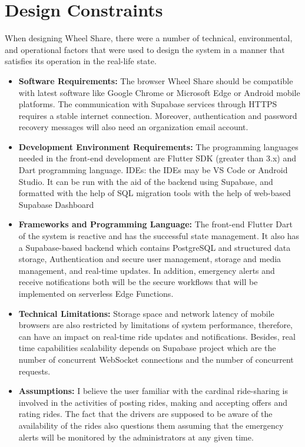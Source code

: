 \section{Design Constraints}
When designing Wheel Share, there were a number of technical, environmental, and operational factors that were used to design the system in a manner that satisfies its operation in the real-life state. 

\begin{itemize}
    \item \textbf{Software Requirements:} The browser Wheel Share should be compatible with latest software like Google Chrome or Microsoft Edge or Android mobile platforms. The communication with Supabase services through HTTPS requires a stable internet connection. Moreover, authentication and password recovery messages will also need an organization email account. 
    \item \textbf{Development Environment Requirements:} The programming languages needed in the front-end development are Flutter SDK (greater than 3.x) and Dart programming language. IDEs: the IDEs may be VS Code or Android Studio. It can be run with the aid of the backend using Supabase, and formatted with the help of SQL migration tools with the help of web-based Supabase Dashboard
    \item \textbf{Frameworks and Programming Language:} The front-end Flutter Dart of the system is reactive and has the successful state management. It also has a Supabase-based backend which contains PostgreSQL and structured data storage, Authentication and secure user management, storage and media management, and real-time updates. In addition, emergency alerts and receive notifications both will be the secure workflows that will be implemented on serverless Edge Functions. 
     \item \textbf{Technical Limitations:} Storage space and network latency of mobile browsers are also restricted by limitations of system performance, therefore, can have an impact on real-time ride updates and notifications. Besides, real time capabilities scalability depends on Supabase project which are the number of concurrent WebSocket connections and the number of concurrent requests.
     \item \textbf{Assumptions:} I believe the user familiar with the cardinal ride-sharing is involved in the activities of posting rides, making and accepting offers and rating rides. The fact that the drivers are supposed to be aware of the availability of the rides also questions them assuming that the emergency alerts will be monitored by the administrators at any given time. 

\end{itemize}

